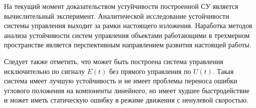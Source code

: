 На текущий момент доказательством устуйчивости построенной СУ является вычислительный эксперимент. Аналитической исследование устойчивости системы управления выходит за рамки настоящего изложения. Наработка методов анализа устойчивости систем управления объектами работающими в трехмерном пространстве является перспективным направлением развития настоящей работы. 

Следует также отметить, что может быть построена система управления исключительно по сигналу $E(t)$ без прямого управления по $U(t)$. Такая система имеет лучшую устойчивость и не имеет проблемы переноса ошибки углового положения на компоненты линейного, но имеет худшее быстродействие и может иметь статическую ошибку в режиме движения с ненулевой скоростью.